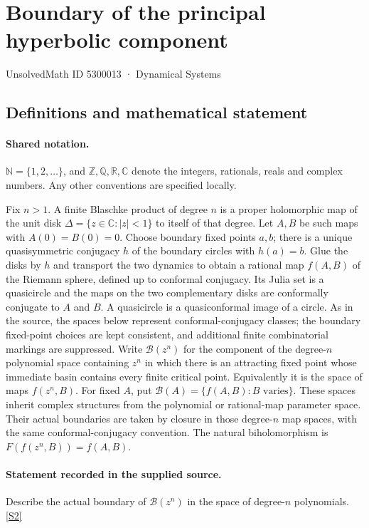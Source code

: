 \documentclass[11pt]{article}
\newcommand{\sref}[2]{\hyperlink{source:#1:#2}{[S#2]}}
\begin{document}
\setcounter{section}{5300012}
\section{Boundary of the principal hyperbolic component}\label{5300013}
{\small\sffamily UnsolvedMath ID 5300013 · Dynamical Systems}
\subsection{Definitions and mathematical statement}

\paragraph{Shared notation.}$\mathbb N=\{1,2,\ldots\}$, and $\mathbb Z,\mathbb Q,\mathbb R,\mathbb C$ denote the integers, rationals, reals and complex numbers. Any other conventions are specified locally.


Fix $n>1$. A finite Blaschke product of degree $n$ is a proper holomorphic map of the unit disk $\Delta=\{z\in\mathbb C:|z|<1\}$ to itself of that degree. Let $A,B$ be such maps with $A(0)=B(0)=0$. Choose boundary fixed points $a,b$; there is a unique quasisymmetric conjugacy $h$ of the boundary circles with $h(a)=b$. Glue the disks by $h$ and transport the two dynamics to obtain a rational map $f(A,B)$ of the Riemann sphere, defined up to conformal conjugacy. Its Julia set is a quasicircle and the maps on the two complementary disks are conformally conjugate to $A$ and $B$. A quasicircle is a quasiconformal image of a circle. As in the source, the spaces below represent conformal-conjugacy classes; the boundary fixed-point choices are kept consistent, and additional finite combinatorial markings are suppressed.
Write $\mathcal B(z^n)$ for the component of the degree-$n$ polynomial space containing $z^n$ in which there is an attracting fixed point whose immediate basin contains every finite critical point. Equivalently it is the space of maps $f(z^n,B)$. For fixed $A$, put $\mathcal B(A)=\{f(A,B):B\text{ varies}\}$. These spaces inherit complex structures from the polynomial or rational-map parameter space. Their actual boundaries are taken by closure in those degree-$n$ map spaces, with the same conformal-conjugacy convention. The natural biholomorphism is $F(f(z^n,B))=f(A,B)$.
\paragraph{Statement recorded in the supplied source.}
Describe the actual boundary of $\mathcal B(z^n)$ in the space of degree-$n$ polynomials. \sref{5300013}{2}
\end{document}
